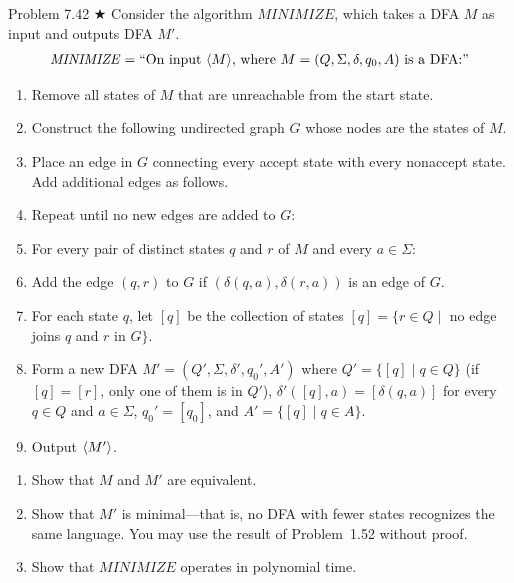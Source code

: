 \begin{question}{Problem 7.42 $\bigstar$}
Consider the algorithm $\mathit{MINIMIZE}$, which takes a DFA $M$ as input and outputs DFA $M'$.
\[
\begin{array}{@{}l@{}}
\mathit{MINIMIZE}=\text{``On input $\enc{M}$, where $M=(Q,\Sigma,\delta,q_0,A)$ is a DFA:''}
\end{array}
\]
\begin{enumerate}
\item Remove all states of $M$ that are unreachable from the start state.
\item Construct the following undirected graph $G$ whose nodes are the states of $M$.
\item Place an edge in $G$ connecting every accept state with every nonaccept state. Add additional edges as follows.
\item Repeat until no new edges are added to $G$:
\item \quad For every pair of distinct states $q$ and $r$ of $M$ and every $a\in\Sigma$:
\item \quad\quad Add the edge $(q,r)$ to $G$ if $(\delta(q,a),\delta(r,a))$ is an edge of $G$.
\item For each state $q$, let $[q]$ be the collection of states $[q]=\{r\in Q\mid$ no edge joins $q$ and $r$ in $G\}$.
\item Form a new DFA $M'=(Q',\Sigma,\delta',q_0',A')$ where
$Q'=\{[q]\mid q\in Q\}$ (if $[q]=[r]$, only one of them is in $Q'$),
$\delta'([q],a)=[\delta(q,a)]$ for every $q\in Q$ and $a\in\Sigma$,
$q_0'=[q_0]$, and
$A'=\{[q]\mid q\in A\}$.
\item Output $\langle M'\rangle$.
\end{enumerate}
\begin{enumerate}[label=\alph*.]
\item Show that $M$ and $M'$ are equivalent.
\item Show that $M'$ is minimal---that is, no DFA with fewer states recognizes the same language. You may use the result of Problem~1.52 without proof.
\item Show that $\mathit{MINIMIZE}$ operates in polynomial time.
\end{enumerate}
\end{question}

